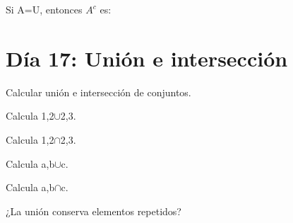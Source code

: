 \begin{activity}[id=dia-16-opcion-02,type=choice,weight=1]

Si A=U, entonces \(A^{c}\) es:





\end{activity}

\section{Día 17: Unión e intersección}

\begin{lesson}[id=dia-17-lectura,weight=0]

Calcular unión e intersección de conjuntos.

\end{lesson}

\begin{activity}[id=dia-17-corta-01,type=short,weight=1]

Calcula {1,2}\(\cup\){2,3}.

\end{activity}

\begin{activity}[id=dia-17-corta-02,type=short,weight=1]

Calcula {1,2}\(\cap\){2,3}.

\end{activity}

\begin{activity}[id=dia-17-corta-03,type=short,weight=1]

Calcula {a,b}\(\cup\){c}.

\end{activity}

\begin{activity}[id=dia-17-corta-04,type=short,weight=1]

Calcula {a,b}\(\cap\){c}.

\end{activity}

\begin{activity}[id=dia-17-corta-05,type=short,weight=1]

¿La unión conserva elementos repetidos?

\end{activity}

